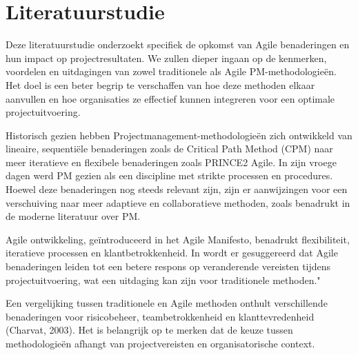 \documentclass[dutch]{hogent-article}
\begin{document}
\section{Literatuurstudie}%
\label{sec:literatuurstudie}


 Deze literatuurstudie onderzoekt specifiek de opkomst van Agile benaderingen en hun impact op projectresultaten. We zullen dieper ingaan op de kenmerken, voordelen en uitdagingen van zowel traditionele als Agile PM-methodologieën. Het doel is een beter begrip te verschaffen van hoe deze methoden elkaar aanvullen en hoe organisaties ze effectief kunnen integreren voor een optimale \linebreak projectuitvoering.
\newline

Historisch gezien hebben Projectmanagement-methodologieën zich ontwikkeld van lineaire, \linebreak sequentiële benaderingen zoals de Critical Path Method (CPM) naar meer iteratieve en flexibele \linebreak benaderingen zoals PRINCE2 Agile. In zijn vroege dagen werd PM gezien als een discipline met strikte processen en procedures. Hoewel deze benaderingen nog steeds relevant zijn, zijn er aanwijzingen voor een verschuiving naar meer adaptieve en collaboratieve methoden, zoals benadrukt in de \linebreak moderne literatuur over PM.\autocite{Demianchuk2020}
\newline

Agile ontwikkeling, geïntroduceerd in het Agile Manifesto, benadrukt flexibiliteit, iteratieve processen en klantbetrokkenheid. In \textcite{Demianchuk2020} wordt er gesuggereerd dat Agile benaderingen leiden tot een betere respons op veranderende vereisten tijdens projectuitvoering, wat een uitdaging kan zijn voor traditionele methoden."
\newline

Een vergelijking tussen traditionele en Agile methoden onthult verschillende benaderingen voor risicobeheer, teambetrokkenheid en klanttevredenheid (Charvat, 2003). Het is belangrijk op te merken dat de keuze tussen methodologieën afhangt van projectvereisten en organisatorische context.\linebreak \autocite{Demianchuk2020}
\newline
\end{document}
